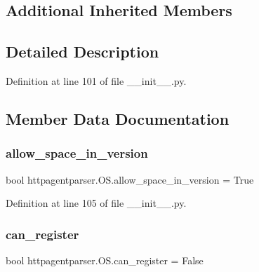 \subsection*{Additional Inherited Members}


\subsection{Detailed Description}


Definition at line 101 of file \+\_\+\+\_\+init\+\_\+\+\_\+.\+py.



\subsection{Member Data Documentation}
\hypertarget{classhttpagentparser_1_1_o_s_a4166e3cef1eeb5141c4762fb20504f7b}{}\label{classhttpagentparser_1_1_o_s_a4166e3cef1eeb5141c4762fb20504f7b} 
\subsubsection{\texorpdfstring{allow\+\_\+space\+\_\+in\+\_\+version}{allow\_space\_in\_version}}
{\footnotesize\ttfamily bool httpagentparser.\+O\+S.\+allow\+\_\+space\+\_\+in\+\_\+version = True\hspace{0.3cm}{\ttfamily [static]}}



Definition at line 105 of file \+\_\+\+\_\+init\+\_\+\+\_\+.\+py.

\hypertarget{classhttpagentparser_1_1_o_s_a9f9e3726f000afb0496798169de83d80}{}\label{classhttpagentparser_1_1_o_s_a9f9e3726f000afb0496798169de83d80} 
\subsubsection{\texorpdfstring{can\+\_\+register}{can\_register}}
{\footnotesize\ttfamily bool httpagentparser.\+O\+S.\+can\+\_\+register = False\hspace{0.3cm}{\ttfamily [static]}}



